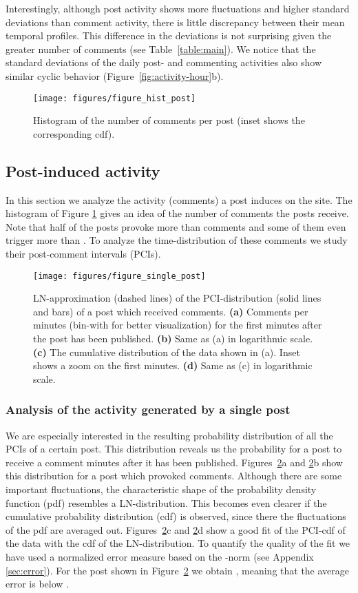 \documentclass[twoside,11pt]{article}
\begin{document}
Interestingly, although post activity shows more fluctuations and
higher standard deviations than comment activity, there is little
discrepancy between their mean temporal profiles.  This difference in
the deviations is not surprising given the greater number of comments
(see Table~\ref{table:main}).  We notice that the standard deviations
of the daily post- and commenting activities also show similar cyclic
behavior (Figure~\ref{fig:activity-hour}b).


\begin{figure}[!tb]\centering
\texttt{[image: figures/figure\_hist\_post]}
\caption{Histogram of the number of comments per post (inset shows the corresponding cdf).}
\label{fig:hist-post}
\end{figure}
\subsection{Post-induced activity}\noindent
In this section we analyze the activity (comments) a post induces on
the site.  The histogram of Figure \ref{fig:hist-post} gives an idea
of the number of comments the posts receive.  Note that half of the
posts provoke more than  comments and some of them even trigger
more than .  To analyze the time-distribution of these comments
we study their post-comment intervals (PCIs).

\begin{figure}[!t]\centering
\texttt{[image: figures/figure\_single\_post]}
\caption{LN-approximation (dashed lines) of the
  PCI-distribution (solid lines and bars) of a post 
   which received  comments.  
  \textbf{(a)} Comments per
  minutes (bin-with for better visualization) for the
  first  minutes after the post has been published.  
  \textbf{(b)} Same as (a) in logarithmic scale.  
  \textbf{(c)} The cumulative distribution of the data shown in (a).
  Inset shows a zoom on the first  minutes.  
  \textbf{(d)} Same as (c) in logarithmic scale.}
\label{fig:post1}
\end{figure}
\subsubsection{Analysis of the activity generated by a single post} \noindent 
We are especially interested in the resulting probability distribution
of all the PCIs of a certain post. This distribution reveals us the
probability for a post to receive a comment  minutes after it has
been published.  Figures~\ref{fig:post1}a and \ref{fig:post1}b show
this distribution for a post which provoked  comments.  Although
there are some important fluctuations, the characteristic shape of the
probability density function (pdf) resembles a LN-distribution.  This
becomes even clearer if the cumulative probability distribution (cdf)
is observed, since there the fluctuations of the pdf are averaged out.
Figures~\ref{fig:post1}c and \ref{fig:post1}d show a good fit of the
PCI-cdf of the data with the cdf of the LN-distribution.  To quantify
the quality of the fit we have used a normalized error measure
 based on the -norm (see Appendix \ref{sec:error}).
For the post shown in Figure~\ref{fig:post1} we obtain
, meaning that the average error is below .
\end{document}
